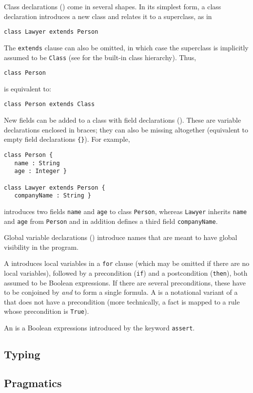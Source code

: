 Class declarations () come in several shapes. In
its simplest form, a class declaration introduces a new class and relates it
to a superclass, as in
\begin{lstlisting}
class Lawyer extends Person
\end{lstlisting}  

The \texttt{extends} clause can also be omitted, in which case the superclass
is implicitly assumed to be \texttt{Class} (see  for the
built-in class hierarchy). Thus,
\begin{lstlisting}
class Person
\end{lstlisting}  
is equivalent to:
\begin{lstlisting}
class Person extends Class
\end{lstlisting}

New fields can be added to a class with field declarations
(). These are variable declarations
enclosed in braces; they can also be missing altogether (equivalent to empty
field declarations \texttt{\{\}}). For example, 
\begin{lstlisting}
class Person {
   name : String
   age : Integer }

class Lawyer extends Person {
   companyName : String }
\end{lstlisting}  
introduces two fields \texttt{name} and \texttt{age} to class \texttt{Person},
whereas \texttt{Lawyer} inherits \texttt{name} and \texttt{age} from
\texttt{Person} and in addition defines a third field \texttt{companyName}.

Global variable declarations () introduce names
that are meant to have global visibility in the program.

A  introduces local variables in a
\texttt{for} clause (which may be omitted if there are no local variables),
followed by a precondition (\texttt{if}) and a postcondition (\texttt{then}),
both assumed to be Boolean expressions. If there are several preconditions,
these have to be conjoined by \emph{and} to form a single formula. 
A  is a notational variant of a  
that does not have a precondition (more technically, a fact is mapped to a
rule whose precondition is \texttt{True}).

An  is a Boolean expressions introduced by the keyword \texttt{assert}.


\subsection{Typing}\label{sec:typing}



\subsection{Pragmatics}\label{sec:pragmatics}



